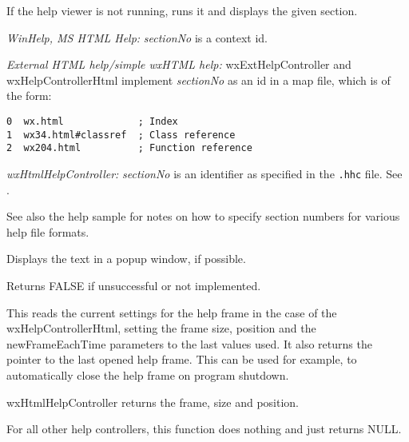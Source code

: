 If the help viewer is not running, runs it and displays the given section.

{\it WinHelp, MS HTML Help:} {\it sectionNo} is a context id.

{\it External HTML help/simple wxHTML help:} wxExtHelpController and wxHelpControllerHtml implement {\it sectionNo} as an id in a map file, which is of the form:

\begin{verbatim}
0  wx.html             ; Index
1  wx34.html#classref  ; Class reference
2  wx204.html          ; Function reference
\end{verbatim}

{\it wxHtmlHelpController:} {\it sectionNo} is an identifier as specified in the {\tt .hhc} file. See .

See also the help sample for notes on how to specify section numbers for various help file formats.

\label{wxhelpcontrollerdisplaytextpopup}


Displays the text in a popup window, if possible.

Returns FALSE if unsuccessful or not implemented.

\label{wxhelpcontrollergetframeparameters}


This reads the current settings for the help frame in the case of the
wxHelpControllerHtml, setting the frame size, position and
the newFrameEachTime parameters to the last values used. It also
returns the pointer to the last opened help frame. This can be used
for example, to automatically close the help frame on program
shutdown.

wxHtmlHelpController returns the frame,
size and position.

For all other help controllers, this function does nothing
and just returns NULL.





